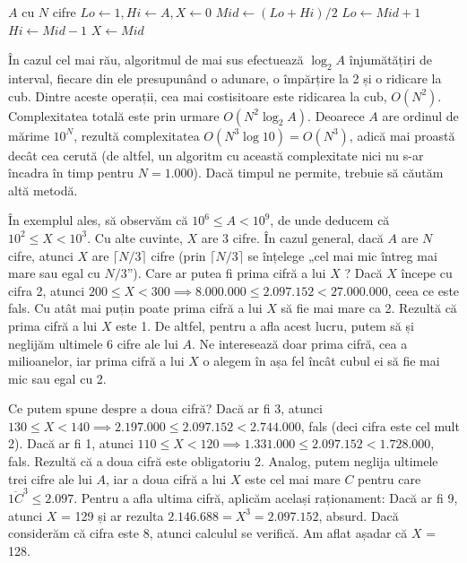 \vspace{\algskip}
\begin{algorithmic}[1]
   $A$ cu $N$ cifre
  \STATE $Lo \leftarrow 1, Hi \leftarrow A, X \leftarrow 0$
  \STATE $Mid \leftarrow (Lo+Hi)/2$
  \STATE $Lo \leftarrow Mid+1$
  \STATE $Hi \leftarrow Mid-1$
  \ELSE
  \STATE $X \leftarrow Mid$
  \ENDIF
  \ENDWHILE
\end{algorithmic}

În cazul cel mai rău, algoritmul de mai sus efectuează $\log_2 A$ înjumătățiri
de interval, fiecare din ele presupunând o adunare, o împărțire la 2 și o
ridicare la cub. Dintre aceste operații, cea mai costisitoare este ridicarea
la cub, $O(N^2)$. Complexitatea totală este prin urmare $O(N^2 \log_2
A)$. Deoarece $A$ are ordinul de mărime $10^N$, rezultă complexitatea $O(N^3
\log 10)= O(N^3)$, adică mai proastă decât cea cerută (de altfel, un algoritm
cu această complexitate nici nu s-ar încadra în timp pentru $N = 1.000$). Dacă
timpul ne permite, trebuie să căutăm altă metodă.

În exemplul ales, să observăm că $10^6 \leq A < 10^9$, de unde deducem că
$10^2 \leq X < 10^3$. Cu alte cuvinte, $X$ are 3 cifre. În cazul general, dacă
$A$ are $N$ cifre, atunci $X$ are $\lceil N / 3 \rceil$ cifre (prin $\lceil N
/ 3 \rceil$ se înțelege „cel mai mic întreg mai mare sau egal cu $N /
3$”). Care ar putea fi prima cifră a lui $X$ ? Dacă $X$ începe cu cifra 2,
atunci $200 \leq X < 300 \implies 8.000.000 \leq 2.097.152 < 27.000.000$, ceea
ce este fals. Cu atât mai puțin poate prima cifră a lui $X$ să fie mai mare ca
2. Rezultă că prima cifră a lui $X$ este 1. De altfel, pentru a afla acest
lucru, putem să și neglijăm ultimele 6 cifre ale lui $A$. Ne interesează doar
prima cifră, cea a milioanelor, iar prima cifră a lui $X$ o alegem în așa fel
încât cubul ei să fie mai mic sau egal cu 2.

Ce putem spune despre a doua cifră? Dacă ar fi 3, atunci $130 \leq X < 140
\implies 2.197.000 \leq 2.097.152 < 2.744.000$, fals (deci cifra este cel mult
2). Dacă ar fi 1, atunci $110 \leq X < 120 \implies 1.331.000 \leq 2.097.152 <
1.728.000$, fals. Rezultă că a doua cifră este obligatoriu 2. Analog, putem
neglija ultimele trei cifre ale lui $A$, iar a doua cifră a lui $X$ este cel
mai mare $C$ pentru care $\overline{1C}^3 \leq 2.097$. Pentru a afla ultima
cifră, aplicăm același raționament: Dacă ar fi 9, atunci $X$ = 129 și ar
rezulta $2.146.688 = X^3 = 2.097.152$, absurd. Dacă considerăm că cifra este
8, atunci calculul se verifică. Am aflat așadar că $X$ = 128.

